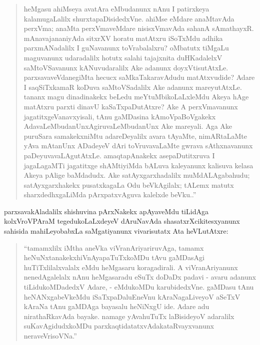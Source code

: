 \begin{quote}
heMgasu ahiMseya avatAra eMbudanunx nAnu I patirxkeya kalamu\-gaLalilx shurxta\-paDisidedxVne. ahiMse eMdare anaMtavAda perxVma; anaMta perxVmaveMdare nisisxVmavAda sahanA sAmathayxR. mAnavajananiyAda sitxrXV horatu matAtxru iSoTxMdu adhika parxmANadalilx I guNa\-vanunx toVrabalalxru? oMbatutx tiMgaLu maguvanunx udaradalilx hotutx salahi tajajxnita duHKadalelxV saMtoVSavanunx kANuvudaralilx Ake adanunx doyxVti\-sutAtxLe. parxsavaveVdanegiMta hecucx saMkaTakaravAdudu matAtxvudide? Adare I saqSiTxkamaR koDuva saMtoVSadalilx Ake adanunx mareyu\-tAtxLe. tananx magu dinadinakekx beLedu meYtuMbikoLaLxleMdu Akeya hAge matAtxru parxti dinavU kaSaTxpaDutAtxre? Ake A perxVmavanunx jagatitxgeV\break anavxyisali, tAnu gaMDasina kAmoVpaBoVgakekx AdavaLeMbudanUnx\break AgiruvaLeMbudanUnx Ake mareyali. Aga Ake puruSara samakekx\-niMtu adareDeyalilx avara tAyaMte, nimARtaLaMte yAva mAtanUnx ADadeyeV dAri toVruvavaLaMte gwrava sAthxnavanunx paDeyuvavaLAgutAtxLe. amaqtapAnakekx asepaDutitxruva I jagaLagaMTi jagatitxge shAMtiyiMda bALuva kaleyanunx kalisuva kelasa Akeya pAlige baMdadudx. Ake satAyxgarxhadalilx  muMdALAgabahudu; satAyxgarxhakekx pusatxkagaLa Odu beVkAgilalx; tALemx matutx sharxdedhxgaLiMda pArxpatxvAguva kalelxde beVku..''
\end{quote}

parxsavakAladalilx shishuvina pArxNakekx apAyaveMdu tiLidAga kolxVroVPAraM tegedu\-koLaLxdeyeV dAruNavAda shasatxrXcikitesxyanunx sahisida mahiLeyobabxLa saMgatiyanunx vivarisutatx Ata heVLutAtxre:
\begin{quote}
``tamamxlilx iMtha aneVka viVranAriyariruvAga, tamamx heNuNxtanakekx\break hiVnAyapaTuTxkoMDu tAvu gaMDasAgi huTiTxlilalxvalalx eMdu heMga\-saru koragadirali. A viVranAriyanunx nenedAgalelalx nAnu heMgasaradu eSuTx doDaDx padavi - avaru adanunx tiLidukoMDadedxV Adare, - eMdu\break\-koMDu karubidedxVne. gaMDasu tAnu heNANxgabeVkeMdu iSaTx\-paDalu\break EneVnu kAraNagaLiveyoV aSeTxV kAraNa tAnu gaMDAga baya\-salu heNiNxgU ide. Adare adu nirathaRkavAda bayake. namage yAva\break huTuTx laBisideyoV adaralilx suKavAgidudxkoMDu parxkaqtidatatxvAda\break kataRvayxvanunx neraveVrisoVNa.''
\end{quote}

